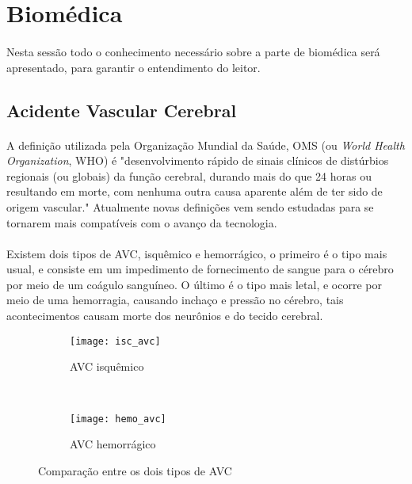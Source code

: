 \section{Biomédica}

	\paragraph{} Nesta sessão todo o conhecimento necessário sobre a parte de biomédica será apresentado, para garantir o entendimento do leitor.
	
	\subsection{Acidente Vascular Cerebral}
	
	\paragraph{}A definição utilizada pela Organização Mundial da Saúde, OMS (ou \textit{World Health Organization}, WHO) é "desenvolvimento rápido de sinais clínicos de distúrbios regionais (ou globais) da função cerebral, durando mais do que 24 horas ou resultando em morte, com nenhuma outra causa aparente além de ter sido de origem vascular."\cite{Cerebrov82} Atualmente novas definições vem sendo estudadas para se tornarem mais compatíveis com o avanço da tecnologia.\cite{Sacco2064}
	
	\paragraph{}Existem dois tipos de AVC, isquêmico e hemorrágico, o primeiro é o tipo mais usual, e consiste em um impedimento de fornecimento de sangue para o cérebro por meio de um coágulo sanguíneo. O último é o tipo mais letal, e ocorre por meio de uma hemorragia, causando inchaço e pressão no cérebro, tais acontecimentos causam morte dos neurônios e do tecido cerebral.
	
	\begin{figure}[H]
		\centering
		\begin{subfigure}{0.5\textwidth}
			\centering
			\texttt{[image: isc\_avc]}
			\caption{AVC isquêmico}
			\label{fig:isq_avc}
		\end{subfigure}~
	\begin{subfigure}{0.5\textwidth}
			\centering
			\texttt{[image: hemo\_avc]}
			\caption{AVC hemorrágico}
			\label{fig:hemo_avc}
		\end{subfigure}
		\caption{Comparação entre os dois tipos de AVC}
	\end{figure}


